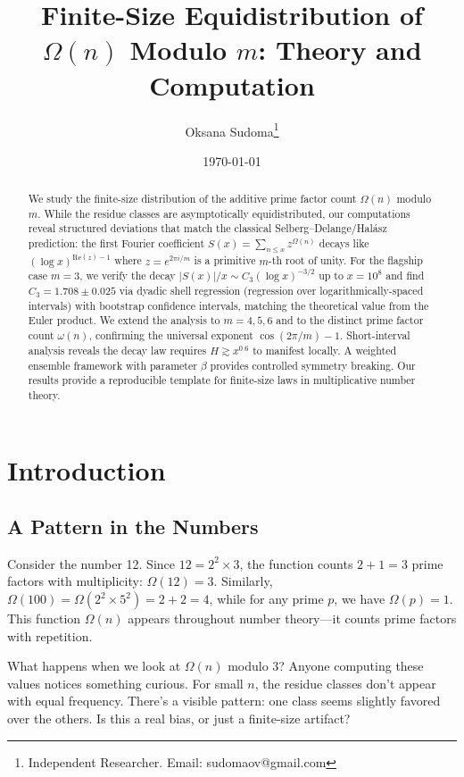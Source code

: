 \documentclass[12pt]{article}
\title{Finite-Size Equidistribution of $\Omega(n)$ Modulo $m$: Theory and Computation}
\author{
Oksana Sudoma\thanks{Independent Researcher. Email: sudomaov@gmail.com}
}
\date{\today}
\theoremstyle{definition}
\theoremstyle{remark}
\begin{document}
\maketitle

\begin{abstract}
We study the finite-size distribution of the additive prime factor count $\Omega(n)$ modulo $m$. While the residue classes are asymptotically equidistributed, our computations reveal structured deviations that match the classical Selberg--Delange/Hal\'asz prediction: the first Fourier coefficient $S(x) = \sum_{n \leq x} z^{\Omega(n)}$ decays like $(\log x)^{\mathrm{Re}(z)-1}$ where $z = e^{2\pi i/m}$ is a primitive $m$-th root of unity. For the flagship case $m = 3$, we verify the decay $|S(x)|/x \sim C_3(\log x)^{-3/2}$ up to $x = 10^8$ and find $C_3 = 1.708 \pm 0.025$ via dyadic shell regression (regression over logarithmically-spaced intervals) with bootstrap confidence intervals, matching the theoretical value from the Euler product. We extend the analysis to $m = 4, 5, 6$ and to the distinct prime factor count $\omega(n)$, confirming the universal exponent $\cos(2\pi/m) - 1$. Short-interval analysis reveals the decay law requires $H \gtrsim x^{0.6}$ to manifest locally. A weighted ensemble framework with parameter $\beta$ provides controlled symmetry breaking. Our results provide a reproducible template for finite-size laws in multiplicative number theory.
\end{abstract}

\section{Introduction}

\subsection{A Pattern in the Numbers}

Consider the number 12. Since $12 = 2^2 \times 3$, the function counts $2 + 1 = 3$ prime factors with multiplicity: $\Omega(12) = 3$. Similarly, $\Omega(100) = \Omega(2^2 \times 5^2) = 2 + 2 = 4$, while for any prime $p$, we have $\Omega(p) = 1$. This function $\Omega(n)$ appears throughout number theory—it counts prime factors with repetition.

What happens when we look at $\Omega(n)$ modulo 3? Anyone computing these values notices something curious. For small $n$, the residue classes don't appear with equal frequency. There's a visible pattern: one class seems slightly favored over the others. Is this a real bias, or just a finite-size artifact?
\end{document}

